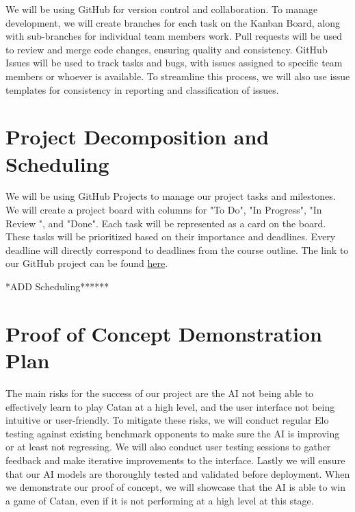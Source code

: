 \documentclass{article}
\begin{document}
\raggedright
We will be using GitHub for version control and collaboration.
To manage development, we will create branches for each task on the Kanban Board,
along with sub-branches for individual team members work. Pull requests 
will be used to review and merge code changes, ensuring quality and 
consistency. GitHub Issues will be used to track tasks and bugs, with 
issues assigned to specific team members or whoever is available.
To streamline this process, we will also use issue templates for 
consistency in reporting and classification of issues. 

\section{Project Decomposition and Scheduling}


\raggedright
We will be using GitHub Projects to manage our project tasks and milestones. We
will create a project board with columns for "To Do", "In Progress", "In Review
", and "Done". Each task will be represented as a card on the board. These tasks
will be prioritized based on their importance and deadlines. Every deadline will
directly correspond to deadlines from the course outline.
The link to our GitHub project can be found
\href{https://github.com/users/SY3141/projects/1}{here}.


*ADD Scheduling******

\section{Proof of Concept Demonstration Plan}

\raggedright
The main risks for the success of our project are the AI not 
being able to effectively learn to play Catan at a high level, 
and the user interface not being intuitive or user-friendly. 
To mitigate these risks, we will conduct regular Elo testing
against existing benchmark opponents to make sure the AI is 
improving or at least not regressing. We will also conduct user 
testing sessions to  gather feedback and make iterative improvements to the interface. 
Lastly we will ensure that our AI models are thoroughly tested and 
validated before deployment. When we demonstrate our proof of concept,
we will showcase that the AI is able to win a game of Catan, even if
it is not performing at a high level at this stage.
\end{document}
